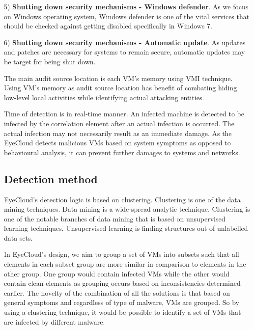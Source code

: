 \documentclass[conference]{IEEEtran}
\begin{document}
5) \textbf{Shutting down security mechanisms - Windows defender}. As we focus on Windows operating system, Windows defender is one of the vital services that should be checked against getting disabled specifically in Windows 7.

6) \textbf{Shutting down security mechanisms - Automatic update}. As updates and patches are necessary for systems to remain secure, automatic updates may be target for being shut down. 

The main audit source location is each VM's memory using VMI technique. Using VM's memory as audit source location has benefit of combating hiding low-level local activities while identifying actual attacking entities. 

Time of detection is in real-time manner. An infected machine is detected to be infected by the correlation element after an actual infection is occurred. The actual infection may not necessarily result as an immediate damage. As the EyeCloud detects malicious VMs based on system symptoms as opposed to behavioural analysis, it can prevent further damages to systems and networks.  
\subsection{Detection method}
EyeCloud's detection logic is based on clustering. Clustering is one of the data mining techniques. Data mining is a wide-spread analytic technique. Clustering is one of the notable branches of data mining that is based on unsupervised learning techniques. Unsupervised learning is finding structures out of unlabelled data sets. 

In EyeCloud's design, we aim to group a set of VMs into subsets such that all elements in each subset group are more similar in comparison to elements in the other group. One group would contain infected VMs while the other would contain clean elements as grouping occurs based on inconsistencies determined earlier. The novelty of the combination of all the solutions is that based on general symptoms and regardless of type of malware, VMs are grouped. So by using a clustering technique, it would be possible to identify a set of VMs that are infected by different malware. 
\end{document}
